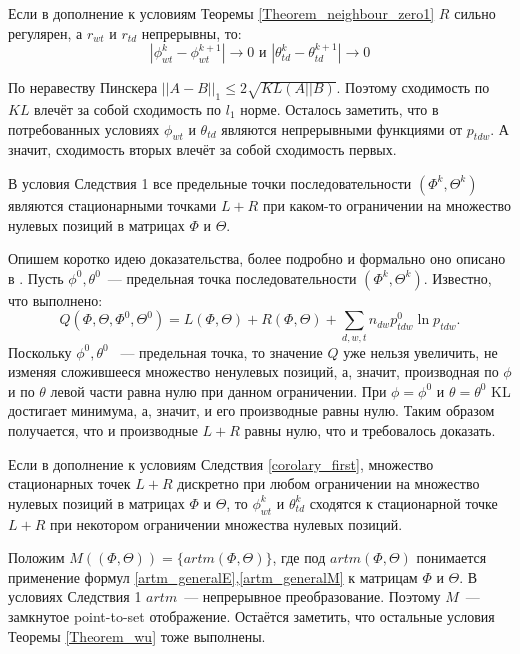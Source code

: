 \documentclass[12pt, twoside]{article}
\begin{document}
\begin{Corollary}
\label{corolary_first}
Если в дополнение к условиям Теоремы \ref{Theorem_neighbour_zero1} $R$ сильно регулярен, а $r_{wt}$ и $r_{td}$ непрерывны, то:
\[
|\phi_{wt}^{k} - \phi_{wt}^{k+1}| \to 0 \text{ и } |\theta_{td}^{k} - \theta_{td}^{k+1}| \to 0
\]
\end{Corollary}
\begin{Proof}
По неравеству Пинскера \cite{topsoe2000some} $||A - B||_1 \leq 2\sqrt{KL(A||B)}$. Поэтому сходимость по $KL$ влечёт за собой сходимость по $l_1$ норме. Осталось заметить, что в потребованных условиях  $\phi_{wt}$ и $\theta_{td}$ являются непрерывными функциями от $p_{tdw}$. А значит, сходимость вторых влечёт за собой сходимость первых.
\end{Proof}
\begin{Corollary}
В условия Следствия 1 все предельные точки последовательности $(\Phi^k, \Theta^k)$ являются стационарными точками $L +  R$ при каком-то ограничении на множество нулевых позиций в матрицах $\Phi$ и $\Theta$.
\end{Corollary}
\begin{Proof}
Опишем коротко идею доказательства,  более подробно и формально оно описано в \cite{wu1983convergence}. Пусть  $\phi^0, \theta^0$~--- предельная точка последовательности $(\Phi^k, \Theta^k)$. Известно, что выполнено:
\[
Q(\Phi, \Theta, \Phi^0, \Theta^0) =  L(\Phi, \Theta) +  R(\Phi, \Theta) + \sum\limits_{d, w, t} n_{dw} p^0_{tdw} \ln{p_{tdw}}.
\]
Поскольку $\phi^0, \theta^0$ ~--- предельная точка, то значение $Q$ уже нельзя увеличить, не изменяя сложившееся множество ненулевых позиций, а, значит, производная по $\phi$ и по $\theta$ левой части равна нулю при данном ограничении. При $\phi = \phi^0$ и $\theta = \theta^0$ KL достигает минимума, а, значит, и его производные равны нулю. Таким образом получается, что и производные $L +  R$ равны нулю, что и требовалось доказать.
\end{Proof}
\begin{Corollary}
Если в дополнение к условиям Следствия \ref{corolary_first}, множество стационарных точек $L +  R$ дискретно при любом  ограничении на множество нулевых позиций в матрицах $\Phi$ и $\Theta$, то $\phi_{wt}^{k}$ и $\theta_{td}^{k}$ сходятся к стационарной точке $L +  R$ при некотором ограничении множества нулевых позиций.
\end{Corollary}
\begin{Proof}
Положим $M((\Phi, \Theta)) = \{artm(\Phi, \Theta)\}$, где под $artm(\Phi, \Theta)$ понимается применение формул \eqref{artm_generalE},\eqref{artm_generalM} к матрицам $\Phi$ и $\Theta$. В условиях Следствия 1 $artm$~--- непрерывное преобразование. Поэтому $M$~--- замкнутое point-to-set отображение. Остаётся заметить, что остальные условия Теоремы \ref{Theorem_wu} тоже выполнены.
\end{Proof}
\end{document}
